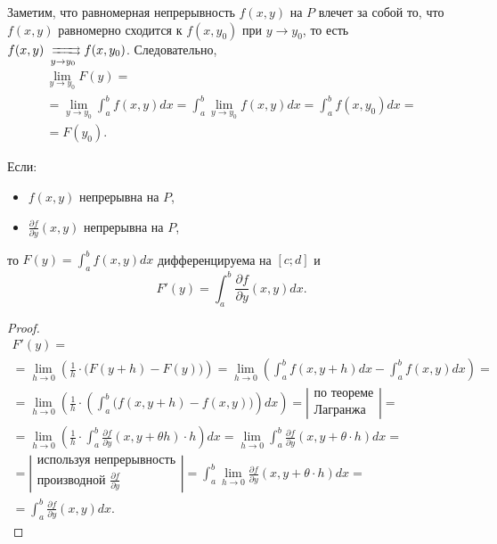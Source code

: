 \begin{remark}
    Заметим, что равномерная непрерывность $f(x,y)$ на $P$ влечет за собой то, что $f(x,y)$ равномерно сходится к $f(x,y_0)$ при $y \rightarrow y_0$, то есть $f(x,y) \xrightrightarrows[y \rightarrow y_0]{} f(x,y_0)$. Следовательно,
    \begin{multline*}
        \underset{y\rightarrow y_0}{\lim}F(y) = \\
        = \underset{y\rightarrow y_0}{\lim}\int_{a}^{b}f(x,y)dx = \int_{a}^{b}\underset{y \rightarrow y_0}{\lim}f(x,y)dx = \int_{a}^{b}f(x,y_0)dx = \\
        = F(y_0).
    \end{multline*}
\end{remark}

\begin{lemma}\label{lemma:7.1.1}
    Если:
    \begin{itemize}
        \item $f(x,y)$ непрерывна на $P$,
        \item $\frac{\partial f}{\partial y}(x,y)$ непрерывна на $P$,
    \end{itemize}
    то $F(y) = \int_{a}^{b}f(x,y)dx$ дифференцируема на $[c;d]$ и
    \[
        F'(y) = \int_{a}^{b}\frac{\partial f}{\partial y}(x,y)dx.
    \]
\end{lemma}

\begin{proof}
    \begin{multline*}
        F'(y) = \\
        = \underset{h\rightarrow 0}{\lim}\left(\frac{1}{h} \cdot \big(F(y+h) - F(y)\big)\right) =\underset{h\rightarrow0}{\lim}\left(\int_{a}^{b}f(x,y+h)dx - \int_{a}^{b}f(x,y)dx\right) = \\
        =\underset{h\rightarrow0}{\lim}\left(\frac{1}{h}\cdot \left(\int_{a}^{b}\big(f(x,y+h) - f(x,y)\big)\right)dx\right) = \left|\begin{array}{c}
            \text{по теореме} \\
            \text{Лагранжа}
        \end{array}\right| = \\
        = \underset{h\rightarrow0}{\lim}\left(\frac{1}{h}\cdot \int_{a}^{b}\frac{\partial f}{\partial y}(x,y+\theta h) \cdot h\right)dx = \underset{h\rightarrow 0}{\lim}\int_{a}^{b}\frac{\partial f}{\partial y}(x,y + \theta \cdot h)dx = \\
        = \left|\begin{array}{c}
            \text{используя непрерывность} \\
            \text{производной } \frac{\partial f}{\partial y}
        \end{array}\right| =\int_{a}^{b}\underset{h\rightarrow 0}{\lim}\frac{\partial f}{\partial y}(x,y+\theta\cdot h)dx = \\
        = \int_{a}^{b}\frac{\partial f}{\partial y}(x,y)dx.
    \end{multline*}
\end{proof}

